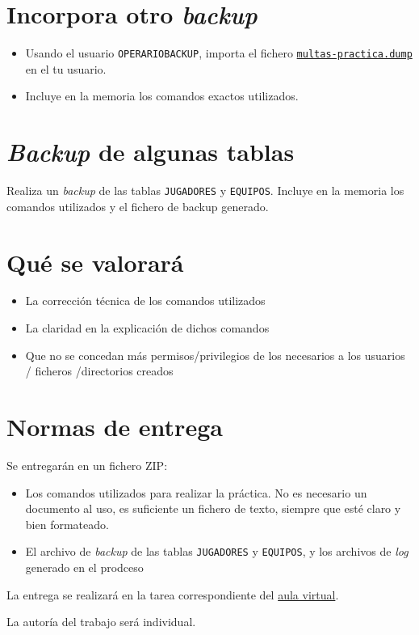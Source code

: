 \documentclass[a4paper]{article}
\begin{document}
\section*{Incorpora otro \emph{backup}}
\label{sec:org000000c}
\begin{itemize}
\item Usando el usuario \texttt{OPERARIOBACKUP}, importa el fichero \href{https://alvarogonzalezsotillo.github.io/apuntes-clase/sistemas-gestores-bbdd-asir2/apuntes/2/multas-practica.dump}{\texttt{multas-practica.dump}} en el tu usuario.
\item Incluye en la memoria los comandos exactos utilizados.
\end{itemize}

\section*{\emph{Backup} de algunas tablas}
\label{sec:org000000f}
Realiza un \emph{backup} de las tablas \texttt{JUGADORES} y \texttt{EQUIPOS}. Incluye en la memoria los comandos utilizados y el fichero de backup generado.  

\section*{Qué se valorará}
\label{sec:org0000012}
\begin{itemize}
\item La corrección técnica de los comandos utilizados
\item La claridad en la explicación de dichos comandos
\item Que no se concedan más permisos/privilegios de los necesarios a los usuarios / ficheros /directorios creados
\end{itemize}

\section*{Normas de entrega}
\label{sec:org0000015}
Se entregarán en un fichero ZIP:
\begin{itemize}
\item Los comandos utilizados para realizar la práctica. No es necesario un documento al uso, es suficiente un fichero de texto, siempre que esté claro y bien formateado.
\item El archivo de \emph{backup} de las tablas \texttt{JUGADORES} y \texttt{EQUIPOS}, y los archivos de \emph{log} generado en el prodceso
\end{itemize}

La entrega se realizará en la tarea correspondiente del \href{https://aulavirtual3.educa.madrid.org/ies.alonsodeavellan.alcala}{aula virtual}.

La autoría del trabajo será individual.
\end{document}
